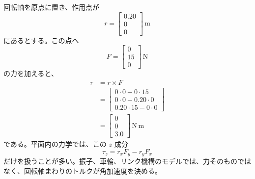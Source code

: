 \begin{example}[平面内の力が作るトルク]
回転軸を原点に置き、作用点が
\begin{equation}
  r=\begin{bmatrix}0.20\\0\\0\end{bmatrix}\,\mathrm{m}
\end{equation}
にあるとする。この点へ
\begin{equation}
  F=\begin{bmatrix}0\\15\\0\end{bmatrix}\,\mathrm{N}
\end{equation}
の力を加えると、
\begin{align}
  \tau
  &=r\times F\\
  &=
  \begin{bmatrix}
    0\cdot0-0\cdot15\\
    0\cdot0-0.20\cdot0\\
    0.20\cdot15-0\cdot0
  \end{bmatrix}\\
  &=
  \begin{bmatrix}0\\0\\3.0\end{bmatrix}\,\mathrm{N\,m}
\end{align}
である。平面内の力学では、この $z$ 成分
\begin{equation}
  \tau_z=r_xF_y-r_yF_x
\end{equation}
だけを扱うことが多い。振子、車輪、リンク機構のモデルでは、力そのものではなく、回転軸まわりのトルクが角加速度を決める。
\end{example}

